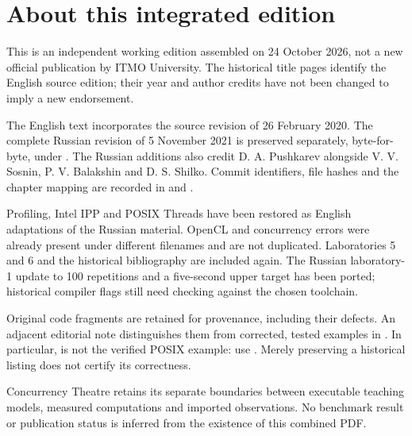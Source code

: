{
\section*{About this integrated edition}
\par This is an independent working edition assembled on 24 October 2026, not a new official publication by ITMO University. The historical title pages identify the English source edition; their year and author credits have not been changed to imply a new endorsement.
\par The English text incorporates the source revision of 26 February 2020. The complete Russian revision of 5 November 2021 is preserved separately, byte-for-byte, under . The Russian additions also credit D. A. Pushkarev alongside V. V. Sosnin, P. V. Balakshin and D. S. Shilko. Commit identifiers, file hashes and the chapter mapping are recorded in  and .
\par Profiling, Intel IPP and POSIX Threads have been restored as English adaptations of the Russian material. OpenCL and concurrency errors were already present under different filenames and are not duplicated. Laboratories 5 and 6 and the historical bibliography are included again. The Russian laboratory-1 update to 100 repetitions and a five-second upper target has been ported; historical compiler flags still need checking against the chosen toolchain.
\par Original code fragments are retained for provenance, including their defects. An adjacent editorial note distinguishes them from corrected, tested examples in . In particular,  is not the verified POSIX example: use . Merely preserving a historical listing does not certify its correctness.
\par Concurrency Theatre retains its separate boundaries between executable teaching models, measured computations and imported observations. No benchmark result or publication status is inferred from the existence of this combined PDF.
}

